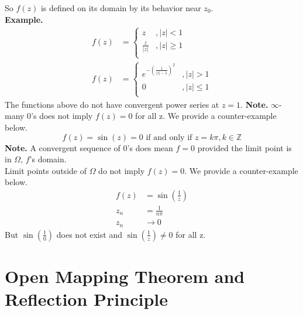 \documentclass[11pt]{article}
\begin{document}

So $f(z)$ is defined on its domain by its behavior near $z_0$. \\
\newline
\textbf{Example.}
\begin{align*}
f(z) &= 
\begin{cases} 
	z &, |z| < 1 \\
	\frac{z}{|z|} &,|z| \geqslant 1\\
   \end{cases} \\
f(z) &= 
\begin{cases} 
	e^{-\left(\frac{1}{|z| - 1}\right)^2} &, |z| > 1 \\
	0 &, |z| \leqslant 1\\
   \end{cases}
\end{align*}
The functions above do not have convergent power series at $z = 1$. 
\newpage
\textbf{Note.} $\infty$-many 0's does not imply $f(z) = 0$ for all z. We provide a counter-example below. 
\begin{equation*}
f(z) = \sin(z) = 0 \mbox{ if and only if } z = k\pi, k \in \mathbb{Z} 
\end{equation*}
\textbf{Note.} A convergent sequence of 0's does mean $f = 0$ provided the limit point is in $\Omega$, $f$'s domain. \\
Limit points outside of $\Omega$ do not imply $f(z) = 0$. We provide a counter-example below. 
\begin{align*}
f(z) &= \sin \left(\frac{1}{z}\right) \\ 
z_n &= \frac{1}{n\pi} \\
z_n &\to 0
\end{align*}
But $\sin \left(\frac{1}{0}\right)$ does not exist and $\sin \left(\frac{1}{z}\right) \neq 0$ for all z. 

\newpage
\section{Open Mapping Theorem and Reflection Principle}
\end{document}
